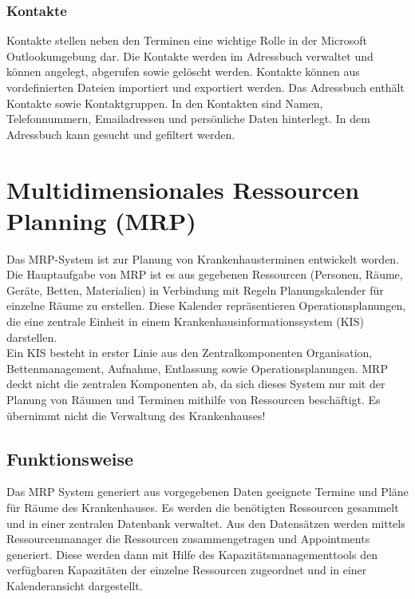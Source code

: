 \subsubsection{Kontakte}
Kontakte stellen neben den Terminen eine wichtige Rolle in der Microsoft Outlookumgebung dar. Die Kontakte werden im Adressbuch verwaltet und können angelegt, abgerufen sowie gelöscht werden. Kontakte können aus vordefinierten Dateien importiert und exportiert werden. Das Adressbuch enthält Kontakte sowie Kontaktgruppen. In den Kontakten sind Namen, Telefonnummern, Emailadressen und persönliche Daten hinterlegt. In dem Adressbuch kann gesucht und gefiltert werden.\cite{joos2013}

\section{Multidimensionales Ressourcen Planning (MRP)}

Das MRP-System ist zur Planung von Krankenhausterminen entwickelt worden. Die Hauptaufgabe von MRP ist es aus gegebenen Ressourcen (Personen, Räume, Geräte, Betten, Materialien) in Verbindung mit Regeln Planungskalender für einzelne Räume zu erstellen. Diese Kalender repräsentieren Operationsplanungen, die eine zentrale Einheit in einem Krankenhausinformationssystem (KIS) darstellen.\\ Ein KIS besteht in erster Linie aus den Zentralkomponenten Organisation, Bettenmanagement, Aufnahme, Entlassung sowie Operationsplanungen. MRP deckt nicht die zentralen Komponenten ab, da sich dieses System nur mit der Planung von Räumen und Terminen mithilfe von Ressourcen beschäftigt. Es übernimmt nicht die Verwaltung des Krankenhauses! \cite{g3mrp,haas2004}
\subsection{Funktionsweise}
Das MRP System generiert aus vorgegebenen Daten geeignete Termine und Pläne für Räume des Krankenhauses. Es werden die benötigten Ressourcen gesammelt und in einer zentralen Datenbank  verwaltet. Aus den Datensätzen werden mittels Ressourcenmanager die Ressourcen zusammengetragen und Appointments generiert. Diese werden dann mit Hilfe des Kapazitätsmanagementtools den verfügbaren Kapazitäten der einzelne Ressourcen zugeordnet und in einer Kalenderansicht dargestellt. \cite{g3mrp}\\
